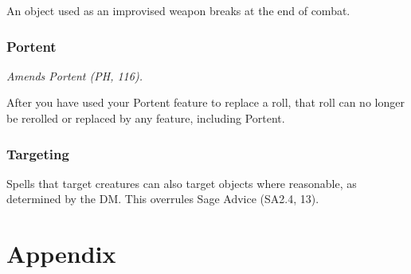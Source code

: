 \documentclass[letterpaper,twocolumn,openany,nodeprecatedcode]{dndbook}
\begin{document}
An object used as an improvised weapon breaks at the end of combat.

\subsection{Portent}
\textit{Amends Portent (PH, 116).}

After you have used your Portent feature to replace a roll, that roll can no longer be rerolled or replaced by any feature, including Portent.

\subsection{Targeting}
Spells that target creatures can also target objects where reasonable, as determined by the DM. This overrules Sage Advice (SA2.4, 13).







\chapter{Appendix}
\end{document}

